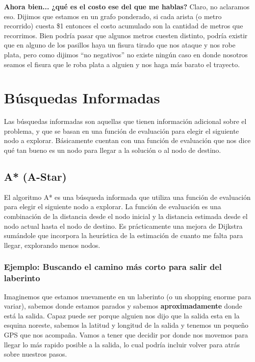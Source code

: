 \documentclass[12pt]{article}
\begin{document}
\vspace{0.5em}

\textbf{Ahora bien... ¿qué es el costo ese del que me hablas?} Claro, no aclaramos eso. Dijimos que estamos en un grafo ponderado, si cada arista (o metro recorrido) cuesta \$1 entonces el costo acumulado son la cantidad de metros que recorrimos. Bien podría pasar que algunos metros cuesten distinto, podría existir que en alguno de los pasillos haya un fisura tirado que nos ataque y nos robe plata, pero como dijimos ``no negativos'' no existe ningún caso en donde nosotros seamos el fisura que le roba plata a alguien y nos haga más barato el trayecto. 

\section{Búsquedas Informadas}

Las búsquedas informadas son aquellas que tienen información adicional sobre el problema, y que se basan en una función de evaluación para elegir el siguiente nodo a explorar. Básicamente cuentan con una función de evaluación que nos dice qué tan bueno es un nodo para llegar a la solución o al nodo de destino.

\subsection{A* (A-Star)}

El algoritmo A* es una búsqueda informada que utiliza una función de evaluación para elegir el siguiente nodo a explorar. La función de evaluación es una combinación de la distancia desde el nodo inicial y la distancia estimada desde el nodo actual hasta el nodo de destino. Es prácticamente una mejora de Dijkstra sumándole que incorpora la heurística de la estimación de cuanto me falta para llegar, explorando menos nodos.

\subsubsection{Ejemplo: Buscando el camino más corto para salir del laberinto}

Imaginemos que estamos nuevamente en un laberinto (o un shopping enorme para variar), sabemos donde estamos parados y sabemos \textbf{aproximadamente} donde está la salida. Capaz puede ser porque alguien nos dijo que la salida esta en la esquina noreste, sabemos la latitud y longitud de la salida y tenemos un pequeño GPS que nos acompaña. Vamos a tener que decidir por donde nos movemos para llegar lo más rapido posible a la salida, lo cual podría incluir volver para atrás sobre nuestros pasos.
\end{document}
